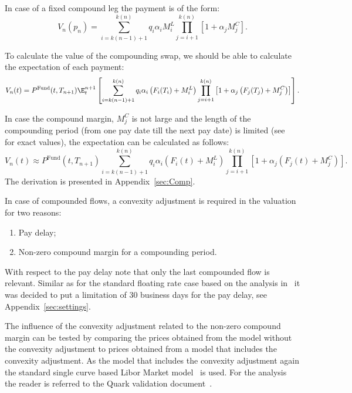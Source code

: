 \documentclass[]{pmv_report} %
\begin{document}
In case of a fixed compound leg the payment is of the form:
\begin{equation}\label{eq:payment}
  V_n(p_n )=\sum_{i=k(n-1)+1}^{k(n)} q_i \alpha_iM_i^L
  \prod_{j=i+1}^{k(n)} \left[ 1+\alpha_j M_j^C \right].
\end{equation}

To calculate the value of the compounding swap, we should be able to calculate the expectation of each payment:
\begin{equation*}
  V_n(t)=P^{\text{Fund}}(t,T_{n+1})\E_t^{n+1}
  \left[
  \sum_{i=k(n-1)+1}^{k(n)} q_i \alpha_i \left( F_i(T_i)+M_i^L \right)
  \prod_{j=i+1}^{k(n)} \left[ 1+\alpha_j \left( F_j(T_j)+M_j^C \right) \right]
  \right].
\end{equation*}

In case the compound margin, $M_j^C$ is not large and the length of the compounding period (from one pay date till the next pay date) is limited (see~\cite{MxSettings.IRS} for exact values), the expectation can be calculated as follows:
\begin{equation*}
  V_n(t)\approx P^{\text{Fund}}(t,T_{n+1})
  \sum_{i=k(n-1)+1}^{k(n)} q_i \alpha_i \left( F_i(t)+M_i^L \right)
  \prod_{j=i+1}^{k(n)} \left[ 1+\alpha_j \left( F_j(t)+M_j^C \right) \right].
\end{equation*}
The derivation is presented in Appendix~\ref{sec:Comp}.

In case of compounded flows, a convexity adjustment is required in the valuation for two reasons:
\begin{enumerate}
  \item Pay delay;
  \item Non-zero compound margin for a compounding period.
\end{enumerate}

With respect to the pay delay note that only the last compounded flow is relevant.
Similar as for the standard floating rate case based on the analysis in~\cite{Quark.RateAdj} it was decided to put a limitation of $30$ business days for the pay delay, see Appendix~\ref{sec:settings}.

The influence of the convexity adjustment related to the non-zero compound margin can be tested by comparing the prices obtained from the model without the convexity adjustment to prices obtained from a model that includes the convexity adjustment.
As the model that includes the convexity adjustment again the standard single curve based Libor Market model~\cite{Quark.CMM} is used.
For the analysis the reader is referred to the Quark validation document~\cite{Quark.CompoundFunctions}.
\end{document}
